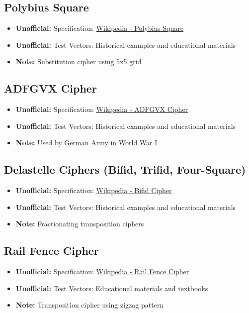 \documentclass[12pt,a4paper]{article}
\newcommand{\unofficial}[1]{\textcolor{warningred}{\textbf{Unofficial:}} #1}
\newcommand{\note}[1]{\textcolor{noteorange}{\textbf{Note:}} #1}
\newcommand{\link}[2]{\href{#1}{#2}}
\begin{document}
\subsection{Polybius Square}
\begin{itemize}
    \item \unofficial{Specification:} \link{https://en.wikipedia.org/wiki/Polybius_square}{Wikipedia - Polybius Square}
    \item \unofficial{Test Vectors:} Historical examples and educational materials
    \item \note{Substitution cipher using 5x5 grid}
\end{itemize}

\subsection{ADFGVX Cipher}
\begin{itemize}
    \item \unofficial{Specification:} \link{https://en.wikipedia.org/wiki/ADFGVX_cipher}{Wikipedia - ADFGVX Cipher}
    \item \unofficial{Test Vectors:} Historical examples and educational materials
    \item \note{Used by German Army in World War I}
\end{itemize}

\subsection{Delastelle Ciphers (Bifid, Trifid, Four-Square)}
\begin{itemize}
    \item \unofficial{Specification:} \link{https://en.wikipedia.org/wiki/Bifid_cipher}{Wikipedia - Bifid Cipher}
    \item \unofficial{Test Vectors:} Historical examples and educational materials
    \item \note{Fractionating transposition ciphers}
\end{itemize}

\subsection{Rail Fence Cipher}
\begin{itemize}
    \item \unofficial{Specification:} \link{https://en.wikipedia.org/wiki/Rail_fence_cipher}{Wikipedia - Rail Fence Cipher}
    \item \unofficial{Test Vectors:} Educational materials and textbooks
    \item \note{Transposition cipher using zigzag pattern}
\end{itemize}
\end{document}
